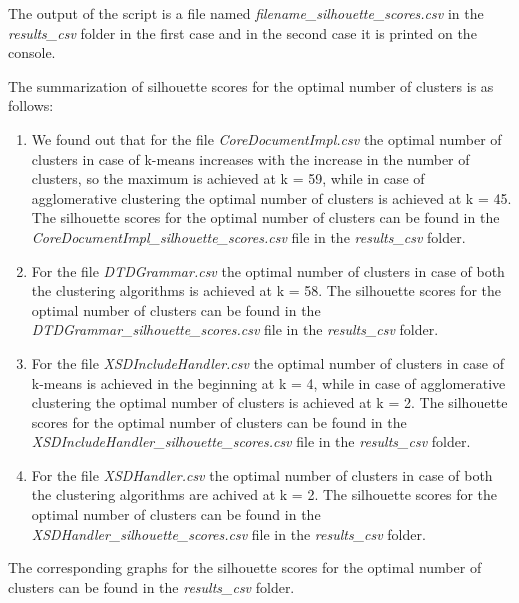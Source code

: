 \documentclass{article}
\begin{document}
The output of the script is a file named \textit{filename\_silhouette\_scores.csv} in the \textit{results\_csv} folder in the first case and in the second case it is printed on the console.

The summarization of silhouette scores for the optimal number of clusters is as follows:
\begin{enumerate}
    \item We found out that for the file \textit{CoreDocumentImpl.csv} the optimal number of clusters in case of k-means increases with the increase in the number of clusters, so the maximum is achieved at k = 59, while in case of agglomerative clustering the optimal number of clusters is achieved at k = 45. The silhouette scores for the optimal number of clusters can be found in the \textit{CoreDocumentImpl\_silhouette\_scores.csv} file in the \textit{results\_csv} folder.
    \item For the file \textit{DTDGrammar.csv} the optimal number of clusters in case of both the clustering algorithms is achieved at k = 58. The silhouette scores for the optimal number of clusters can be found in the \textit{DTDGrammar\_silhouette\_scores.csv} file in the \textit{results\_csv} folder.
    \item For the file \textit{XSDIncludeHandler.csv} the optimal number of clusters in case of k-means is achieved in the beginning at k = 4, while in case of agglomerative clustering the optimal number of clusters is achieved at k = 2. The silhouette scores for the optimal number of clusters can be found in the \textit{XSDIncludeHandler\_silhouette\_scores.csv} file in the \textit{results\_csv} folder.
    \item For the file \textit{XSDHandler.csv} the optimal number of clusters in case of both the clustering algorithms are achived at k = 2. The silhouette scores for the optimal number of clusters can be found in the \textit{XSDHandler\_silhouette\_scores.csv} file in the \textit{results\_csv} folder.
\end{enumerate}
The corresponding graphs for the silhouette scores for the optimal number of clusters can be found in the \textit{results\_csv} folder.


\end{document}
